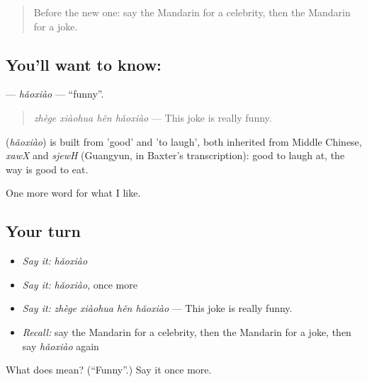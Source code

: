 \label{lesson:ZH-C267-haoxiao}



\begin{quote}
Before the new one: say the Mandarin for a celebrity, then the Mandarin for a joke.
\end{quote}

\subsection*{You'll want to know: }
\textbf{} — \emph{hǎoxiào} — \textquotedblleft{}funny\textquotedblright{}.

\begin{quote}
\textbf{} \emph{zhège xiàohua hěn hǎoxiào} — This joke is really funny.
\end{quote}

\begin{cousinweb}
\textbf{} (\emph{hǎoxiào}) is built from  'good' and  'to laugh', both inherited from Middle Chinese, \emph{xawX} and \emph{sjewH} (Guangyun, in Baxter's transcription): good to laugh at, the way  is good to eat.
\end{cousinweb}

\begin{grammarlens}[title={What you've built}]
One more word for what I like.
\end{grammarlens}

\subsection*{Your turn}
\begin{itemize}
\raggedright
  \item \emph{Say it:} \emph{hǎoxiào}
  \item \emph{Say it:} \emph{hǎoxiào}, once more
  \item \emph{Say it:} \emph{zhège xiàohua hěn hǎoxiào} — This joke is really funny.
  \item \emph{Recall:} say the Mandarin for a celebrity, then the Mandarin for a joke, then say \emph{hǎoxiào} again
\end{itemize}

\begin{tcolorbox}[breakable,colback=teal!4,colframe=teal!35!black,title={Before you move on}]
What does  mean? (\textquotedblleft{}Funny\textquotedblright{}.) Say it once more.
\end{tcolorbox}
